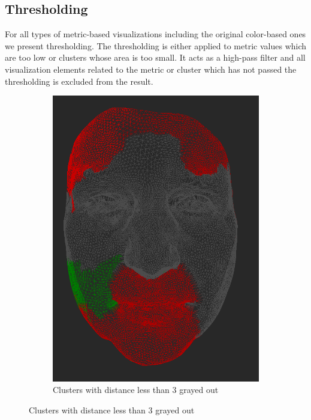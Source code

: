 \subsection{Thresholding}

For all types of metric-based visualizations including the original color-based ones we present thresholding. The thresholding is either applied to metric values which are too low or clusters whose area is too small. It acts as a high-pass filter and all visualization elements related to the metric or cluster which has not passed the thresholding is excluded from the result.

\begin{figure}[h]
\centering
	\begin{subfigure}{0.3\textwidth}
	\includegraphics[width=\textwidth]{./img/meshdiff-thresholding-clustercolor-length3.PNG}
    \caption{Clusters with distance less than 3 grayed out}
    \label{fig:meshdiff_thresholding_clustercolor}

\end{subfigure}
\end{figure}
